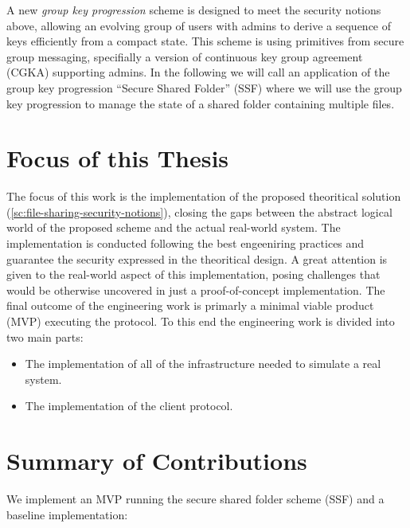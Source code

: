A new \textit{group key progression} scheme is designed to meet the security notions above,
allowing an evolving group of users with admins to derive a sequence of keys efficiently from a compact state. 
This scheme is using primitives from secure group messaging, 
specifially a version of continuous key group agreement (CGKA) supporting admins.\cite{USENIX:BalColVau23}
In the following we will call an application of the group key progression ``Secure Shared Folder'' (SSF)
where we will use the group key progression to manage the state of a shared folder containing multiple files. 

\section{Focus of this Thesis}\label{sc:focus-of-this-thesis}

The focus of this work is the implementation of the proposed theoritical solution (\cref{sc:file-sharing-security-notions}),
closing the gaps between the abstract logical world of the proposed scheme
and the actual real-world system.
The implementation is conducted following the best engeeniring practices 
and guarantee the security expressed in the theoritical design.
A great attention is given to the real-world aspect of this implementation,
posing challenges that would be otherwise uncovered in just a proof-of-concept implementation.
The final outcome of the engineering work is primarly a minimal viable product (MVP) executing the protocol.
To this end the engineering work is divided into two main parts:
\begin{itemize}
    \item The implementation of all of the infrastructure needed to simulate a real system.
    \item The implementation of the client protocol.
\end{itemize}

\section{Summary of Contributions}

We implement an MVP running the secure shared folder scheme (SSF) and a baseline implementation:

